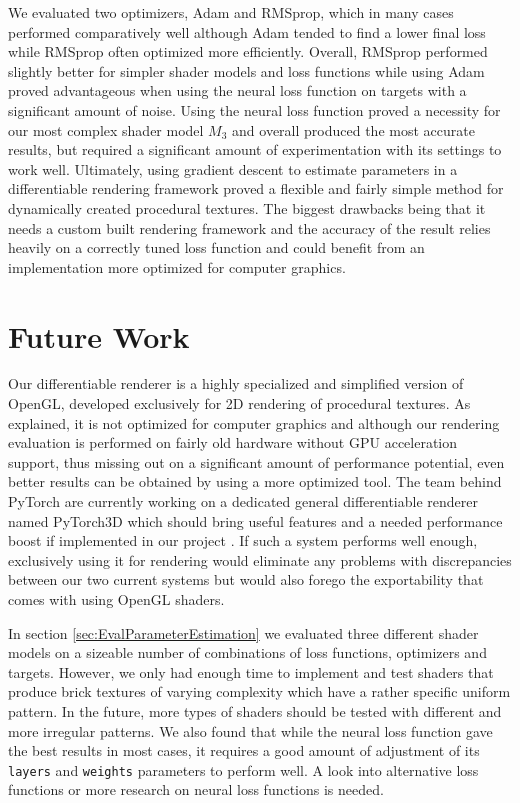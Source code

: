 We evaluated two optimizers, Adam and RMSprop, which in many cases performed comparatively well although Adam tended to find a lower final loss while RMSprop often optimized more efficiently. Overall, RMSprop performed slightly better for simpler shader models and loss functions while using Adam proved advantageous when using the neural loss function on targets with a significant amount of noise. Using the neural loss function proved a necessity for our most complex shader model $M_3$ and overall produced the most accurate results, but required a significant amount of experimentation with its settings to work well. Ultimately, using gradient descent to estimate parameters in a differentiable rendering framework proved a flexible and fairly simple method for dynamically created procedural textures. The biggest drawbacks being that it needs a custom built rendering framework and the accuracy of the result relies heavily on a correctly tuned loss function and could benefit from an implementation more optimized for computer graphics.


\section{Future Work}

Our differentiable renderer is a highly specialized and simplified version of OpenGL, developed exclusively for 2D rendering of procedural textures. As explained, it is not optimized for computer graphics and although our rendering evaluation is performed on fairly old hardware without GPU acceleration support, thus missing out on a significant amount of performance potential, even better results can be obtained by using a more optimized tool. The team behind PyTorch are currently working on a dedicated general differentiable renderer named PyTorch3D which should bring useful features and a needed performance boost if implemented in our project \cite{facebookresearch_2020_facebookresearchpytorch3d}. If such a system performs well enough, exclusively using it for rendering would eliminate any problems with discrepancies between our two current systems but would also forego the exportability that comes with using OpenGL shaders.

In section \ref{sec:EvalParameterEstimation} we evaluated three different shader models on a sizeable number of combinations of loss functions, optimizers and targets. However, we only had enough time to implement and test shaders that produce brick textures of varying complexity which have a rather specific uniform pattern. In the future, more types of shaders should be tested with different and more irregular patterns. We also found that while the neural loss function gave the best results in most cases, it requires a good amount of adjustment of its \texttt{layers} and \texttt{weights} parameters to perform well. A look into alternative loss functions or more research on neural loss functions is needed.
